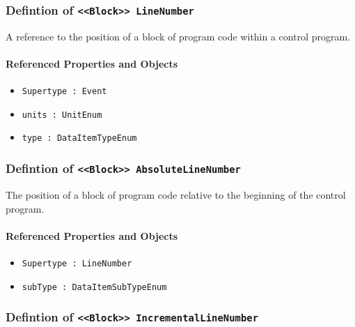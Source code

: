 \subsubsection{Defintion of \texttt{<<Block>> LineNumber}}
  \label{type:LineNumber}

\FloatBarrier

A reference to the position of a block of program code within a control program.

\FloatBarrier
\paragraph{Referenced Properties and Objects}

\begin{itemize}
\item \texttt{Supertype : Event}

\item \texttt{units : UnitEnum}

\item \texttt{type : DataItemTypeEnum}

\end{itemize}
\FloatBarrier
\subsubsection{Defintion of \texttt{<<Block>> AbsoluteLineNumber}}
  \label{type:AbsoluteLineNumber}

\FloatBarrier

The position of a block of program code relative to the beginning of the control program.

\FloatBarrier
\paragraph{Referenced Properties and Objects}

\begin{itemize}
\item \texttt{Supertype : LineNumber}

\item \texttt{subType : DataItemSubTypeEnum}

\end{itemize}
\FloatBarrier
\subsubsection{Defintion of \texttt{<<Block>> IncrementalLineNumber}}
  \label{type:IncrementalLineNumber}

